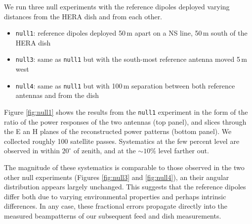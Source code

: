 \documentclass[preprint]{aastex}
\begin{document}
We run three null experiments with the reference dipoles deployed varying distances from the HERA dish and from each other.

\begin{itemize}
\item \texttt{null1}: reference dipoles deployed 50\,m apart on a NS line, 50\,m south of the HERA dish
\item \texttt{null3}: same as \texttt{null1} but with the south-most reference antenna moved 5\,m west
\item \texttt{null4}: same as \texttt{null1} but with 100\,m separation between both reference antennas and from the dish
\end{itemize}

Figure \ref{fig:null1} shows the results from the \texttt{null1} experiment in the form of the ratio of the power responses of the two antennas (top panel), and slices through the E an H planes of the reconstructed power patterns (bottom panel). We collected roughly 100 satellite passes. Systematics at the few percent level are observed in  within $20^\circ$ of zenith, and at the $\sim10\%$ level farther out.

The magnitude of these systematics is comparable to those observed in the two other null experiments (Figures \ref{fig:null3} and \ref{fig:null4}), an their angular distribution appears largely unchanged. This suggests that the reference dipoles differ both due to varying environmental properties and perhaps intrinsic differences. In any case, these fractional errors propagate directly into the measured beampatterns of our subsequent feed and dish measurements.  
\end{document}
